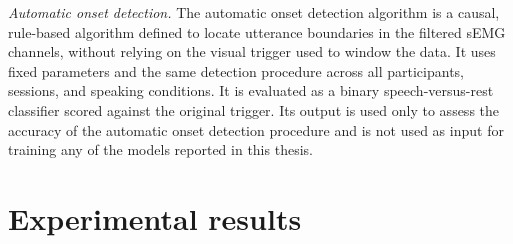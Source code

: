 \documentclass{article}
\newcommand{\giovanni}[1]{\textcolor{red}{[\textbf{Giovanni}: #1]}}
\begin{document}
\textit{Automatic onset detection.} The automatic onset detection algorithm is a causal, rule-based algorithm defined to locate utterance boundaries in the filtered sEMG channels, without relying on the visual trigger used to window the data. It uses fixed parameters and the same detection procedure across all participants, sessions, and speaking conditions. It is evaluated as a binary speech-versus-rest classifier scored against the original trigger. Its output is used only to assess the accuracy of the automatic onset detection procedure and is not used as input for training any of the models reported in this thesis. %

\section{Experimental results}
\end{document}
